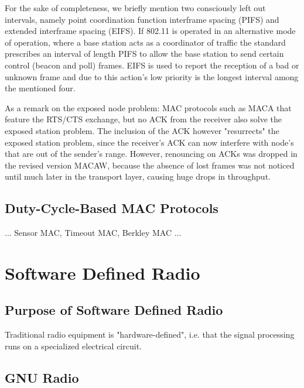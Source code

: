 \medskip
For the sake of completeness, we briefly mention two consciously left out intervals, namely point coordination function interframe spacing (PIFS) and extended interframe spacing (EIFS). If 802.11 is operated in an alternative mode of operation, where a base station acts as a coordinator of traffic the standard prescribes an interval of length PIFS to allow the base station to send certain control (beacon and poll) frames. EIFS is used to report the reception of a bad or unknown frame and due to this action's low priority is the longest interval among the mentioned four. 

\bigskip

As a remark on the exposed node problem: MAC protocols such as MACA that feature the RTS/CTS exchange, but no ACK from the receiver also solve the exposed station problem. The inclusion of the ACK however "resurrects" the exposed station problem, since the receiver's ACK can now interfere with node's that are out of the sender's range. However, renouncing on ACKs was dropped in the revised version MACAW, because the absence of lost frames was not noticed until much later in the transport layer, causing huge drops in throughput.

\subsection{Duty-Cycle-Based MAC Protocols}  

... Sensor MAC, Timeout MAC, Berkley MAC ...

\section{Software Defined Radio}
 
\subsection{Purpose of Software Defined Radio}

Traditional radio equipment is "hardware-defined", i.e. that the signal processing runs on a specialized electrical circuit.

\subsection{GNU Radio}


